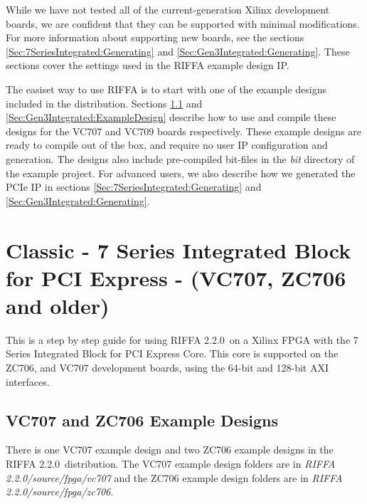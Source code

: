 \documentclass{refrep}
\newcommand{\RIFFAVer}{2.2.0}
\newcommand{\Directory}[1]{\textit{#1}}
\begin{document}
While we have not tested all of the current-generation Xilinx development
boards, we are confident that they can be supported with minimal
modifications. For more information about supporting new boards, see the
sections \ref{Sec:7SeriesIntegrated:Generating} and
\ref{Sec:Gen3Integrated:Generating}. These sections cover the settings used
in the RIFFA example design IP.

The easiset way to use RIFFA is to start with one of the example designs
included in the distribution. Sections \ref{Sec:7SeriesIntegrated:ExampleDesign}
and \ref{Sec:Gen3Integrated:ExampleDesign} describe how to use and compile these
designs for the VC707 and VC709 boards respectively. These example designs are
ready to compile out of the box, and require no user IP configuration and
generation. The designs also include pre-compiled bit-files in the
\Directory{bit} directory of the example project. For advanced users, we also
describe how we generated the PCIe IP in sections
\ref{Sec:7SeriesIntegrated:Generating} and
\ref{Sec:Gen3Integrated:Generating}.

\section{Classic - 7 Series Integrated Block for PCI Express - (VC707, ZC706 and older)}  
This is a step by step guide for using RIFFA \RIFFAVer~on a Xilinx FPGA with the
7 Series Integrated Block for PCI Express Core. This core is supported on the
ZC706, and VC707 development boards, using the 64-bit and 128-bit AXI
interfaces.

\subsection{VC707 and ZC706 Example Designs}
\label{Sec:7SeriesIntegrated:ExampleDesign}
There is one VC707 example design and two ZC706 example designs in the RIFFA
\RIFFAVer~distribution. The VC707 example design folders are in \Directory{RIFFA
  \RIFFAVer/source/fpga/vc707} and the ZC706 example design folders are in
\Directory{RIFFA \RIFFAVer/source/fpga/zc706}.
\end{document}
